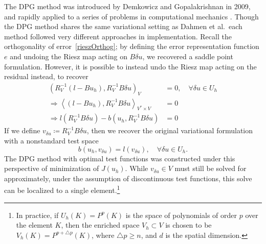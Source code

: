 \documentclass[final,leqno]{siamltex}
\newcommand{\LRp}[1]{\left( #1 \right)}
\newcommand{\LRa}[1]{\left\langle #1 \right\rangle}
\begin{document}
The DPG method was introduced by Demkowicz and Gopalakrishnan in 2009, and rapidly applied to a series of problems in computational mechanics \cite{DPG2,DPG3,DPG4,maxwellDPG,stokesDPG}.  Though the DPG method shares the same variational setting as Dahmen et al.\, each method followed very different approaches in implementation.  Recall the orthogonality of error~\eqref{rieszOrthog}; by defining the error representation function $e$ and undoing the Riesz map acting on $B\delta u$, we recovered a saddle point formulation.  However, it is possible to instead undo the Riesz map acting on the residual instead, to recover
\begin{align*}
\LRp{R_V^{-1}\LRp{l-Bu_h},R_V^{-1}B\delta u}_V &= 0, \quad \forall \delta u \in U_h\\
\Rightarrow \LRa{\LRp{l-Bu_h},R_V^{-1}B\delta u}_{V^*\times V} &= 0\\
\Rightarrow l\LRp{R_V^{-1}B\delta u}-b\LRp{u_h,R_V^{-1}B\delta u} &= 0
\end{align*}
If we define $v_{\delta u} \coloneqq R_V^{-1}B\delta u$, then we recover the original variational formulation with a nonstandard test space
\[
b(u_h,v_{\delta u}) = l(v_{\delta u}), \quad \forall \delta u \in U_h.
\]
The DPG method with optimal test functions was constructed under this perspective of minimization of $J(u_h)$.  While $v_{\delta u} \in V$ must still be solved for approximately, under the assumption of discontinuous test functions, this solve can be localized to a single element.\footnote{In practice, if $U_h(K) = P^p(K)$ is the space of polynomials of order $p$ over the element $K$, then the enriched space $V_h \subset V$ is chosen to be $V_h(K) = P^{p+\triangle p}(K)$, where $\triangle p \geq n$, and $d$ is the spatial dimension.}
\end{document}
